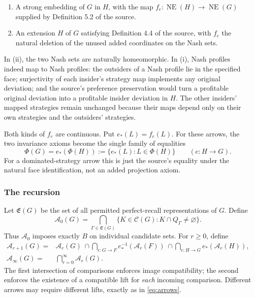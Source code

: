\documentclass[11pt]{article}
\theoremstyle{definition}
\newcommand{\NE}{\operatorname{NE}}
\newcommand{\CC}{\mathscr C}
\newcommand{\A}{\mathcal A}
\begin{document}
\begin{enumerate}[label=(\roman*)]
\item A strong embedding of $G$ in $H$, with the map
$f_e:\NE(H)\to\NE(G)$ supplied by Definition 5.2 of the source.
\item An extension $H$ of $G$ satisfying Definition 4.4 of the source, with
$f_e$ the natural deletion of the unused added coordinates on the Nash sets.
\end{enumerate}
In (ii), the two Nash sets are naturally homeomorphic. In (i), Nash profiles
indeed map to Nash profiles: the outsiders of a Nash profile lie in the
specified face; surjectivity of each insider's strategy map implements any
original deviation; and the source's preference preservation would turn a
profitable original deviation into a profitable insider deviation in $H$.
The other insiders' mapped strategies remain unchanged because their maps
depend only on their own strategies and the outsiders' strategies.

Both kinds of $f_e$ are continuous. Put $e_*(L)=f_e(L)$. For these arrows,
the two invariance axioms become the single family of equalities
\begin{equation}\label{eq:arrows}
 \Phi(G)=e_*(\Phi(H))
 :=\{e_*(L):L\in\Phi(H)\}\qquad(e:H\to G).
\end{equation}
For a dominated-strategy arrow this is just the source's equality under the
natural face identification, not an added projection axiom.

\subsubsection{The recursion}
Let $\mathfrak E(G)$ be the set of all permitted perfect-recall representations
of $G$. Define
\begin{equation}\label{eq:A0}
 \A_0(G)=\bigcap_{\Gamma\in\mathfrak E(G)}
 \{K\in\CC(G):K\cap Q_\Gamma\ne\varnothing\}.
\end{equation}
Thus $\A_0$ imposes exactly $B$ on individual candidate sets. For $r\ge0$, define
\begin{equation}\label{eq:recursion}
\begin{split}
 \A_{r+1}(G)={}&\A_r(G)\ \cap\!
 \bigcap_{e:G\to F}e_*^{-1}(\A_r(F))\ \cap\!
 \bigcap_{e:H\to G}e_*(\A_r(H)),\\
 \A_\infty(G)={}&\bigcap_{r=0}^{\infty}\A_r(G).
\end{split}
\end{equation}
The first intersection of comparisons enforces image compatibility; the
second enforces the existence of a compatible lift for \emph{each} incoming
comparison. Different arrows may require different lifts, exactly as in
\eqref{eq:arrows}.
\end{document}
